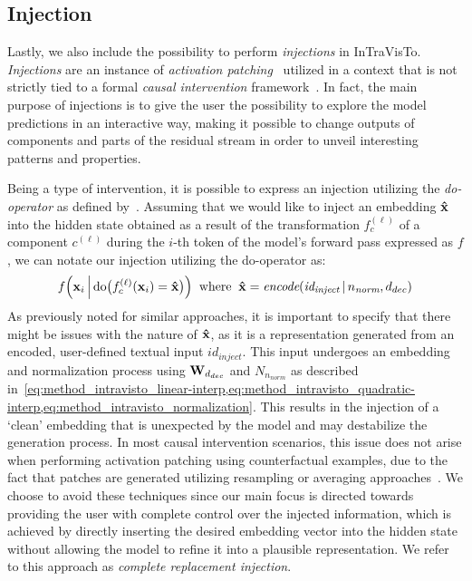 \subsection{Injection}\label{ssec:method_intravisto_injection}

Lastly, we also include the possibility to perform \emph{injections} in InTraVisTo.
\emph{Injections} are an instance of \emph{activation patching}~\cite{olsson2022,meng2022,hanna2023,conmy2023,wang2023,mohebbi2023,zhang2024} utilized in a context that is not strictly tied to a formal \emph{causal intervention} framework~\cite{geiger2021,mcgrath2023}.
In fact, the main purpose of injections is to give the user the possibility to explore the model predictions in an interactive way, making it possible to change outputs of components and parts of the residual stream in order to unveil interesting patterns and properties.

Being a type of intervention, it is possible to express an injection utilizing the \emph{do-operator} as defined by~\citet{pearl2009}.
Assuming that we would like to inject an embedding $\bm{\mathbf{\hat x}}$ into the hidden state obtained as a result of the transformation $f_c^{(\ell)}$ of a component $c^{(\ell)}$ during the $i$-th token of the model's forward pass expressed as $f$, we can notate our injection utilizing the do-operator as:
\begin{equation}
    \label{eq:method_intravisto_inj_complete}
    f\Bigl(\bm{\mathbf{x}}_i \, \Big| \, \text{do}\bigl(f_c^{(\ell)}(\bm{\mathbf{x}}_i) = \bm{\mathbf{\hat x}}\bigr)\Bigr)
    \;\; \text{where} \;\; \bm{\mathbf{\hat x}} = \textit{encode}(\textit{id}_{\textit{inject}} \,|\, n_\textit{norm}, d_{dec})
\end{equation}
As previously noted for similar approaches, it is important to specify that there might be issues with the nature of $\bm{\mathbf{\hat x}}$, as it is a representation generated from an encoded, user-defined textual input ${id}_{\textit{inject}}$.
This input undergoes an embedding and normalization process using $\bm{\mathbf{W}}_{d_{dec}}$ and $N_{n_\textit{norm}}$ as described in~\cref{eq:method_intravisto_linear-interp,eq:method_intravisto_quadratic-interp,eq:method_intravisto_normalization}.
This results in the injection of a `clean' embedding that is unexpected by the model and may destabilize the generation process.
In most causal intervention scenarios, this issue does not arise when performing activation patching using counterfactual examples, due to the fact that patches are generated utilizing resampling or averaging approaches~\cite{hanna2023,conmy2023,wang2023}.
We choose to avoid these techniques since our main focus is directed towards providing the user with complete control over the injected information, which is achieved by directly inserting the desired embedding vector into the hidden state without allowing the model to refine it into a plausible representation.
We refer to this approach as \emph{complete replacement injection}.

